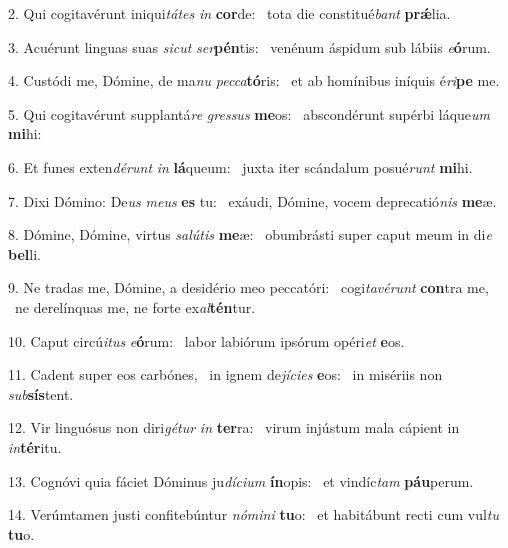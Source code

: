 2. Qui cogitavérunt iniqui\textit{tá}\textit{tes} \textit{in} \textbf{cor}de: \ast\  tota die constitué\textit{bant} \textbf{prǽ}lia.\

3. Acuérunt linguas suas \textit{sic}\textit{ut} \textit{ser}\textbf{pén}tis: \ast\  venénum áspidum sub lábiis \textit{e}\textbf{ó}rum.\

4. Custódi me, Dómine, de ma\textit{nu} \textit{pec}\textit{ca}\textbf{tó}ris: \ast\  et ab homínibus iníquis é\textit{ri}\textbf{pe} me.\

5. Qui cogitavérunt supplantá\textit{re} \textit{gres}\textit{sus} \textbf{me}os: \ast\  abscondérunt supérbi láque\textit{um} \textbf{mi}hi:\

6. Et funes exten\textit{dé}\textit{runt} \textit{in} \textbf{lá}queum: \ast\  juxta iter scándalum posué\textit{runt} \textbf{mi}hi.\

7. Dixi Dómino: De\textit{us} \textit{me}\textit{us} \textbf{es} tu: \ast\  exáudi, Dómine, vocem deprecatió\textit{nis} \textbf{me}æ.\

8. Dómine, Dómine, virtus \textit{sa}\textit{lú}\textit{tis} \textbf{me}æ: \ast\  obumbrásti super caput meum in di\textit{e} \textbf{bel}li.\

9. Ne tradas me, Dómine, a desidério meo peccatóri: \dag\  cogi\textit{ta}\textit{vé}\textit{runt} \textbf{con}tra me, \ast\  ne derelínquas me, ne forte ex\textit{al}\textbf{tén}tur.\

10. Caput circú\textit{i}\textit{tus} \textit{e}\textbf{ó}rum: \ast\  labor labiórum ipsórum opéri\textit{et} \textbf{e}os.\

11. Cadent super eos carbónes, \dag\  in ignem de\textit{jí}\textit{ci}\textit{es} \textbf{e}os: \ast\  in misériis non \textit{sub}\textbf{sís}tent.\

12. Vir linguósus non diri\textit{gé}\textit{tur} \textit{in} \textbf{ter}ra: \ast\  virum injústum mala cápient in \textit{in}\textbf{tér}itu.\

13. Cognóvi quia fáciet Dóminus ju\textit{dí}\textit{ci}\textit{um} \textbf{ín}opis: \ast\  et vindíc\textit{tam} \textbf{páu}perum.\

14. Verúmtamen justi confitebúntur \textit{nó}\textit{mi}\textit{ni} \textbf{tu}o: \ast\  et habitábunt recti cum vul\textit{tu} \textbf{tu}o.\

